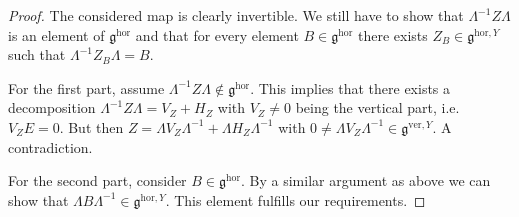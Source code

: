 \documentclass[10pt,a4paper]{amsart}
\begin{document}
\begin{proof}
    The considered map is clearly invertible. We still have to show that $\Lambda^{-1}Z\Lambda$ is an element of $\mathfrak{g}^{\mathrm{hor}}$ and that for every element $B\in\mathfrak{g}^\mathrm{hor}$ there exists $Z_B\in\mathfrak{g}^{\mathrm{hor},Y}$ such that $\Lambda^{-1}Z_B\Lambda = B$.

    For the first part, assume $\Lambda^{-1}Z\Lambda\notin\mathfrak{g}^{\mathrm{hor}}$. This implies that there exists a decomposition $\Lambda^{-1}Z\Lambda = V_Z + H_Z$ with $V_Z\neq 0$ being the vertical part, i.e. $V_ZE = 0$. But then $Z = \Lambda{}V_Z{}\Lambda^{-1} + \Lambda{}H_Z\Lambda^{-1}$  with $0 \neq\Lambda{}V_Z{}\Lambda^{-1}\in\mathfrak{g}^{\mathrm{ver},Y}$. A contradiction.

    For the second part, consider $B\in\mathfrak{g}^\mathrm{hor}$. By a similar argument as above we can show that $\Lambda{}B\Lambda^{-1}\in\mathfrak{g}^{\mathrm{hor},Y}$. This element fulfills our requirements.
\end{proof}
\end{document}
